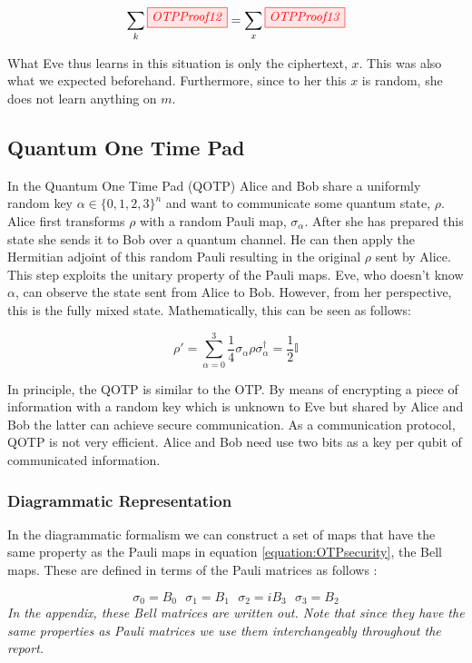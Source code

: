 \documentclass[]{article}
\begin{document}
\begin{equation}
\sum\limits_{k} \tikzfig{OTPProof12} = \sum\limits_{x} \tikzfig{OTPProof13}
\end{equation}

What Eve thus learns in this situation is only the ciphertext, $x$. This was also what we expected beforehand. Furthermore, since to her this $x$ is random, she does not learn anything on $m$.

\subsection{Quantum One Time Pad}
\label{QOTP}
In the Quantum One Time Pad (QOTP) Alice and Bob share a uniformly random key $ \alpha \in \{0,1,2,3\}^n$ and want to communicate some quantum state, $\rho$. Alice first transforms $\rho$ with a random Pauli map, $\sigma_\alpha$. After she has prepared this state she sends it to Bob over a quantum channel. He can then apply the Hermitian adjoint of this random Pauli resulting in the original $\rho$ sent by Alice. This step exploits the unitary property of the Pauli maps. Eve, who doesn't know $\alpha$, can observe the state sent from Alice to Bob. However, from her perspective, this is the fully mixed state. Mathematically, this can be seen as follows:

\begin{equation}
	\label{equation:OTPsecurity}
	\rho' = \sum\limits_{\alpha = 0}^3 \frac{1}{4} \sigma_\alpha \rho \sigma_\alpha^\dagger = \frac{1}{2}\mathbb{I}
\end{equation}

In principle, the QOTP is similar to the OTP. By means of encrypting a piece of information with a random key which is unknown to Eve but shared by Alice and Bob the latter can achieve secure communication. As a communication protocol, QOTP is not very efficient. Alice and Bob need use two bits as a key per qubit of communicated information.

\subsubsection{Diagrammatic Representation}
\label{DiagramRepresentationQOTP}
In the diagrammatic formalism we can construct a set of maps that have the same property as the Pauli maps in equation \ref{equation:OTPsecurity}, the Bell maps. These are defined in terms of the Pauli matrices as follows \cite{Coecke2017}:

\begin{equation}
	\sigma_0 = B_0 ~~~ \sigma_1 = B_1 ~~~ \sigma_2 = iB_3 ~~~ \sigma_3 = B_2 
\end{equation}
\textit{In the appendix, these Bell matrices are written out. Note that since they have the same properties as Pauli matrices we use them interchangeably throughout the report.}
\end{document}
